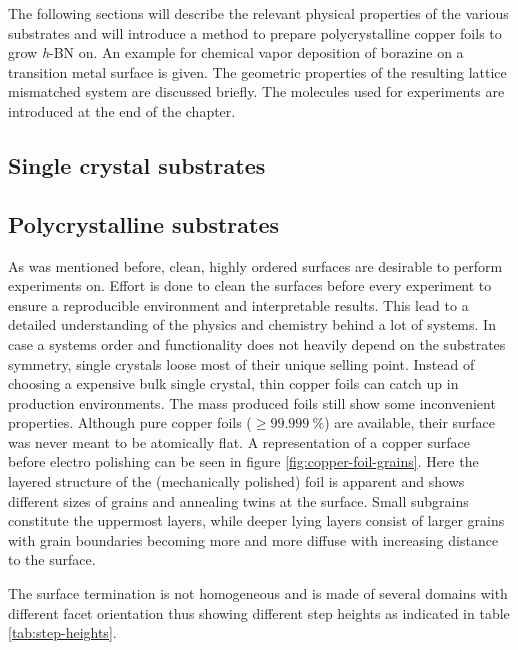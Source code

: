 \documentclass[
10pt,					%
a4paper,				%
twoside,				%
BCOR=8mm,				%
headings=normal,		%
headsepline,			%
footsepline,			%
plainfootsepline,		%
]{scrbook}
\begin{document}
The following sections will describe the relevant physical properties of the various substrates and will introduce a method to prepare polycrystalline copper foils to grow \textit{h}-BN on. An example for chemical vapor deposition of borazine on a transition metal surface is given. The geometric properties of the resulting lattice mismatched system are discussed briefly. The molecules used for experiments are introduced at the end of the chapter.
     \subsection{Single crystal substrates}
        
     \subsection{Polycrystalline substrates}
     As was mentioned before, clean, highly ordered surfaces are desirable to perform experiments on. Effort is done to clean the surfaces before every experiment to ensure a reproducible environment and interpretable results. This lead to a detailed understanding of the physics and chemistry behind a lot of systems. In case a systems order and functionality does not heavily depend on the substrates symmetry, single crystals loose most of their unique selling point. Instead of choosing a expensive bulk single crystal, thin copper foils can catch up in production environments. The mass produced foils still show some inconvenient properties. Although pure copper foils ($\geq \SI{99.999}{\percent}$) are available, their surface was never meant to be atomically flat. 
     A representation of a copper surface before electro polishing can be seen in figure \ref{fig:copper-foil-grains}. Here the layered structure of the (mechanically polished) foil is apparent and shows different sizes of grains and annealing twins at the surface. Small subgrains constitute the uppermost layers, while deeper lying layers consist of larger grains with grain boundaries becoming more and more diffuse with increasing distance to the surface.
     
     The surface termination is not homogeneous and is made of several domains with different facet orientation thus showing different step heights as indicated in table \ref{tab:step-heights}.
\end{document}
